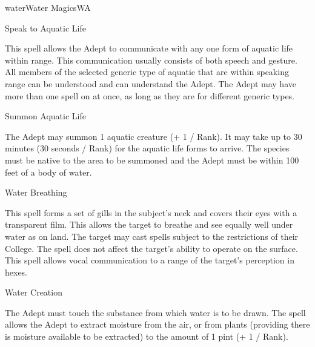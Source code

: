\begin{College}[1.3]{water}{Water Magics}{WA}
\begin{spell}[G-9]{Speak to Aquatic Life}
\begin{effects}
This spell allows the Adept to communicate with any one form of
aquatic life within range.  This communication usually consists of
both speech and gesture.  All members of the selected generic type of
aquatic that are within speaking range can be understood and can
understand the Adept. The Adept may have more than one spell on at
once, as long as they are for different generic types.
\end{effects}
\end{spell}

\begin{spell}[G-10]{Summon Aquatic Life}

\begin{effects}
The Adept may summon 1 aquatic creature (+ 1 / Rank).  It may take up
to 30 minutes (30 seconds / Rank) for the aquatic life forms to
arrive.  The species must be native to the area to be summoned and
the Adept must be within 100 feet of a body of water.
\end{effects}
\end{spell}

\begin{spell}[G-11]{Water Breathing}

\begin{effects}
This spell forms a set of gills in the subject’s neck and covers their
eyes with a transparent film.  This allows the target to breathe and
see equally well under water as on land.  The target may cast spells
subject to the restrictions of their College. The spell does not
affect the target’s ability to operate on the surface.  This spell
allows vocal communication to a range of the target’s perception in
hexes.
\end{effects}
\end{spell}

\begin{spell}[G-12]{Water Creation}

\begin{effects}
The Adept must touch the substance from which water is to be drawn.
The spell allows the Adept to extract moisture from the air, or from
plants (providing there is moisture available to be extracted) to the
amount of 1 pint (+ 1 / Rank).
\end{effects}
\end{spell}


\end{College}
